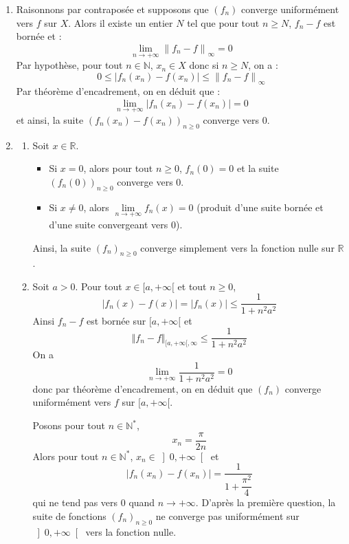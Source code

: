 \documentclass[a4paper,10pt]{report}
\begin{document}
\corr \begin{enumerate}

\item Raisonnons par contraposée et supposons que $(f_n)$ converge uniformément vers $f$ sur $X$. Alors il existe un entier $N$ tel que pour tout $n\geq N$, $f_n-f$ est bornée et :
$$\lim\limits_{n\to+\infty}^{}\left\| {f_n  - f} \right\|_\infty   = 0$$
Par hypothèse, pour tout $n\in\mathbb{N}$, $x_n\in X$ donc si $n \geq N$, on a :
$$0 \leq \left| {f_n (x_n ) - f(x_n )} \right| \leqslant \left\| {f_n  - f} \right\|_\infty  $$
Par théorème d'encadrement, on en déduit que :
$$\lim\limits_{n\to+\infty}^{}\left| {f_n (x_n ) - f(x_n )} \right|=0$$
et ainsi, la suite $( {f_n (x_n ) - f(x_n )})_{n \geq 0}$ converge vers $0$.

\item
\begin{enumerate}
\item Soit $x\in\mathbb{R}$.
\begin{itemize}
\item Si $x=0$, alors pour tout $n \geq 0$, $f_n(0)=0$ et la suite $(f_n(0))_{n \geq 0}$ converge vers $0$.
\item Si $x \neq 0$, alors $\lim\limits_{n\to+\infty}^{}f_n (x)=0$ (produit d'une suite bornée et d'une suite convergeant vers $0$).
\end{itemize}
Ainsi, la suite $(f_n)_{n \geq 0}$ converge simplement vers la fonction nulle sur $\mathbb{R}$.
\item Soit $a>0$. Pour tout $x \in [a, + \infty[$ et tout $n \geq 0$,
$$\left| {f_n (x)} -f(x)\right|=|f_n(x)| \leq \dfrac{1}{{1 + n^2a^2  }}$$
Ainsi $f_n-f$ est bornée sur $[a, + \infty[$ et 
$$ \Vert f_n -f \Vert_{[a, + \infty[, \infty} \leq \dfrac{1}{{1 + n^2a^2  }}$$
On a 
$$\lim\limits_{n\to+\infty}^{}\dfrac{1}{{1 + n^2a^2  }}=0$$
donc par théorème d'encadrement, on en déduit que $(f_n)$ converge uniformément vers $f$ sur $[a, + \infty[$.

\medskip

\noindent Posons pour tout $n\in\mathbb{N}^*$, 
$$x_n  = \dfrac{\pi}{2n}$$
Alors pour tout $n \in \mathbb{N}^*$, $x_n\in \left]  0,+\infty\right[$ et  
$$|f_n (x_n )-f(x_n)| = \dfrac{1}{{1 + \dfrac{{\pi ^2 }}{4}}}$$
qui ne tend pas vers 0 quand $n\rightarrow +\infty$. D'après la première question, la suite de fonctions $(f_n)_{n \geq 0}$ ne converge pas uniformément sur $\left] {0, + \infty } \right[$ vers la fonction nulle.
\end{enumerate}
\end{enumerate}
\end{document}
